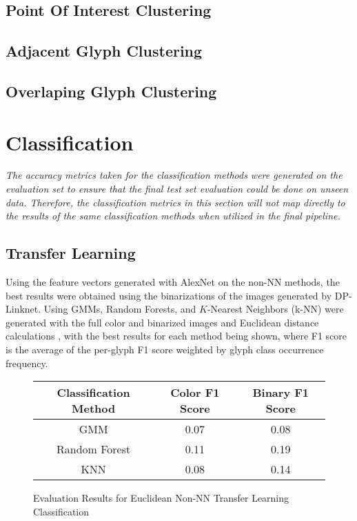\subsection{Point Of Interest Clustering}

\subsection{Adjacent Glyph Clustering}

\subsection{Overlaping Glyph Clustering}

\section{Classification}

\textit{The accuracy metrics taken for the classification methods were generated on the evaluation set to ensure that the final test set evaluation could be done on unseen data. Therefore, the classification metrics in this section will not map directly to the results of the same classification methods when utilized in the final pipeline.}

\subsection{Transfer Learning}

Using the feature vectors generated with AlexNet on the non-NN methods, the best results were obtained using the binarizations of the images generated by DP-Linknet. Using GMMs, Random Forests, and $K$-Nearest Neighbors (k-NN)  were generated with the full color and binarized images and Euclidean distance calculations , with the best results for each method being shown, where F1 score is the average of the per-glyph F1 score weighted by glyph class occurrence frequency.

\begin{figure}[H]
    \caption{Evaluation Results for Euclidean Non-NN Transfer Learning Classification}
    \label{fig:classificationEuclideanNonNN}
    \centering
    \begin{tabular}{ | c | c | c | }
        \hline
        Classification Method & Color F1 Score & Binary F1 Score \\
        \hline
        GMM & 0.07 & 0.08 \\
        Random Forest & 0.11 & 0.19 \\
        KNN & 0.08 & 0.14 \\
        \hline
    \end{tabular}
\end{figure}

